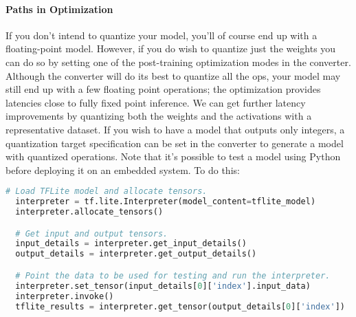 \documentclass[12pt]{article}
\begin{document}
\paragraph{Paths in Optimization} If you don't intend to quantize your model, you'll of course end up with a floating-point model. However, if you do wish to quantize just the weights you can do so by setting one of the post-training optimization modes in the converter. Although the converter will do its best to quantize all the ops, your model may still end up with a few floating point operations; the optimization provides latencies close to fully fixed point inference. We can get further latency improvements by quantizing both the weights and the activations with a representative dataset. If you wish to have a model that outputs only integers, a quantization target specification can be set in the converter to generate a model with quantized operations. Note that it's possible to test a model using Python before deploying it on an embedded system. To do this:
\begin{lstlisting}[language=Python]
  # Load TFLite model and allocate tensors.
  interpreter = tf.lite.Interpreter(model_content=tflite_model)
  interpreter.allocate_tensors()

  # Get input and output tensors.
  input_details = interpreter.get_input_details()
  output_details = interpreter.get_output_details()

  # Point the data to be used for testing and run the interpreter.
  interpreter.set_tensor(input_details[0]['index'].input_data)
  interpreter.invoke()
  tflite_results = interpreter.get_tensor(output_details[0]['index'])
\end{lstlisting}
\end{document}

